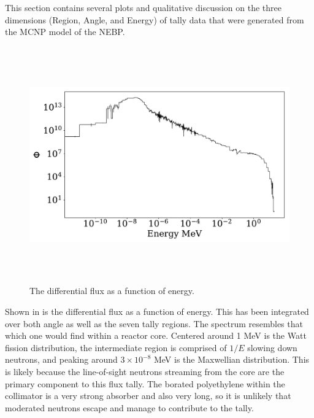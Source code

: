 This section contains several plots and qualitative discussion on the three dimensions (Region, Angle, and Energy) of tally data that were generated from the MCNP model of the NEBP.


\begin{figure}[htb]
\centering
\includegraphics[height=4in]{tex/figures/flux_erg.pdf}
\caption[Flux vs. Energy]{The differential flux as a function of energy.}
\label{fig:flux_erg}
\end{figure}

Shown in  is the differential flux as a function of energy.
This has been integrated over both angle as well as the seven tally regions.
The spectrum resembles that which one would find within a reactor core.
Centered around 1 MeV is the Watt fission distribution, the intermediate region is comprised of $1/E$ slowing down neutrons, and peaking around $3 \times 10^{-8}$ MeV is the Maxwellian distribution.
This is likely because the line-of-sight neutrons streaming from the core are the primary component to this flux tally.
The borated polyethylene within the collimator is a very strong absorber and also very long, so it is unlikely that moderated neutrons escape and manage to contribute to the tally.


